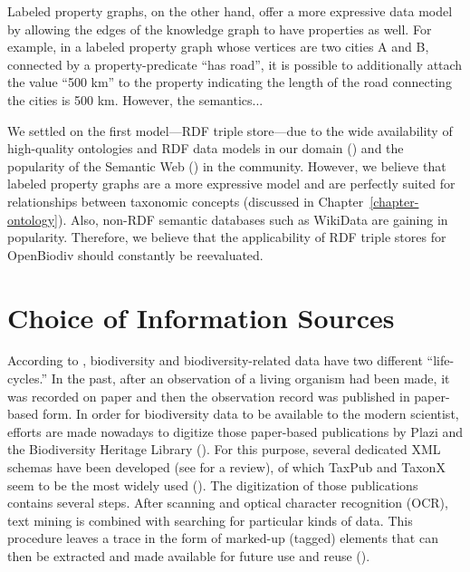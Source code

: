 Labeled property graphs, on the other hand, offer a more expressive data model by allowing the edges of the knowledge graph to have properties as well. For example, in a labeled property graph whose vertices are two cities A and B, connected by a property-predicate ``has road'', it is possible to additionally attach the value ``500 km'' to the property indicating the length of the road connecting the cities is 500 km. However, the semantics...

We settled on the first model---RDF triple store---due to the wide availability of high-quality ontologies and RDF data models in our domain (\cite{baskauf_darwin-sw:_2016,peroni_semantic_2014}) and the popularity of the Semantic Web (\cite{berners-lee_semantic_2001}) in the community. However, we believe that labeled property graphs are a more expressive model and are perfectly suited for relationships between taxonomic concepts (discussed in Chapter~\ref{chapter-ontology}). Also, non-RDF semantic databases such as \mbox{WikiData} are gaining in popularity. Therefore, we believe that the applicability of RDF triple stores for OpenBiodiv should constantly be reevaluated.

\section{Choice of Information Sources}

According to \cite{soraya_sierra_coordination_2014}, biodiversity and biodiversity-related data have two different ``life-cycles.'' In the past, after an observation of a living organism had been made, it was recorded on paper and then the observation record was published in paper-based form. In order for biodiversity data to be available to the modern scientist, efforts are made nowadays to digitize those paper-based publications by Plazi and the Biodiversity Heritage Library (\cite{agosti_why_2007,miller_taxonomic_2012}). For this purpose, several dedicated XML schemas have been developed (see \cite{penev_xml_2011} for a review), of which TaxPub and TaxonX  seem to be the most widely used (\cite{catapano_taxpub:_2010,penev_implementation_2012}). The digitization of those publications contains several steps. After scanning and optical character recognition (OCR), text mining is combined with searching for particular kinds of data. This procedure leaves a trace in the form of marked-up (tagged) elements that can then be extracted and made available for future use and reuse (\cite{miller_integrating_2015}).

